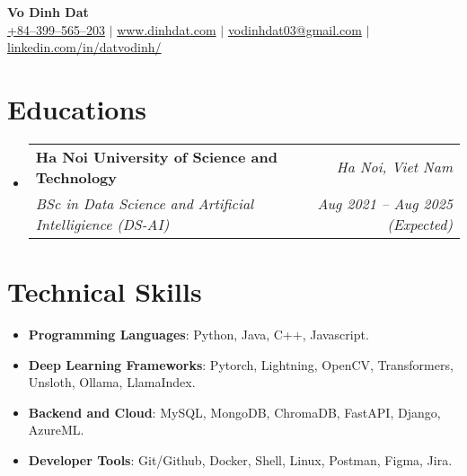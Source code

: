 \documentclass[letterpaper,11pt]{article}
\makeatletter
\newcommand{\resumeitem}[1]{
  \item\small{
    #1 \vspace{-2pt}
  }
}
\newcommand{\resumeSubheading}[4]{
  \vspace{-1pt}\item
    \begin{tabular*}{0.97\textwidth}[t]{l@{\extracolsep{\fill}}r}
      \textbf{#1} & \textit{#2} \\
      \textit{\small#3} & \textit{\small #4} \\
    \end{tabular*}\vspace{-6pt}
}
\newcommand{\resumeSubHeadingListStart}{\begin{itemize}[leftmargin=*,label={}]}
\newcommand{\resumeSubHeadingListEnd}{\end{itemize}}
\newcommand{\resumeItemListStart}{\begin{itemize}}
\newcommand{\resumeItemListEnd}{\end{itemize}\vspace{-5pt}}
\makeatother
\begin{document}

\begin{center}
  \textbf{\LARGE {Vo Dinh Dat}} \\ \vspace{1pt}
  \href{tel:+84399565203}{{+84--399--565--203}} $|$ \href{https://dinhdat.com}{{www.dinhdat.com}}
  $|$ \href{mailto:vodinhdat03@gmail.com}{{vodinhdat03@gmail.com}} $|$ 
  \href{https://www.linkedin.com/in/datvodinh/}{{linkedin.com/in/datvodinh/}}
  
\end{center}

\section{Educations}
  \resumeSubHeadingListStart
    \resumeSubheading
      {Ha Noi University of Science and Technology}{\textit{Ha Noi, Viet Nam}}
      {BSc in Data Science and Artificial Intelligience (DS-AI)}{Aug 2021 -- Aug 2025 (Expected)}
  \resumeSubHeadingListEnd

  
\section{Technical Skills}
\resumeItemListStart[leftmargin=*,label={}]
  \resumeitem{\textbf{Programming Languages}: {Python, Java, C++, Javascript.}} \\[-\baselineskip]
  \resumeitem{\textbf{Deep Learning Frameworks}: {Pytorch, Lightning, OpenCV, Transformers, Unsloth, Ollama, LlamaIndex.}} \\[-\baselineskip]
  \resumeitem{\textbf{Backend and Cloud}: {MySQL, MongoDB, ChromaDB, FastAPI, Django, AzureML.}} \\[-\baselineskip]
  \resumeitem{\textbf{Developer Tools}: {Git/Github, Docker, Shell, Linux, Postman, Figma, Jira.}}\\[-\baselineskip]
\resumeItemListEnd
\end{document}

